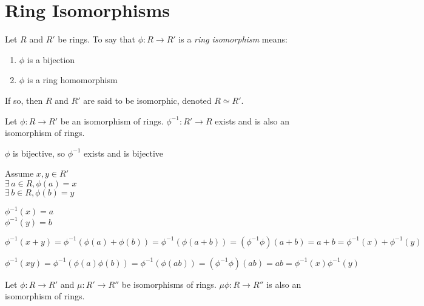 \documentclass[letterpaper,12pt,fleqn]{article}
\begin{document}
\section*{Ring Isomorphisms}

\begin{definition}
  Let $R$ and $R'$ be rings. To say that $\phi:R\to R'$ is a \emph{ring isomorphism}
  means:
  \begin{enumerate}
  \item $\phi$ is a bijection
  \item $\phi$ is a ring homomorphism
  \end{enumerate}
  If so, then $R$ and $R'$ are said to be isomorphic, denoted $R\simeq R'$.
\end{definition}

\begin{lemma}
  Let $\phi:R\to R'$ be an isomorphism of rings. $\phi^{-1}:R'\to R$ exists and is also an
  isomorphism of rings.
\end{lemma}

\begin{theproof}
  $\phi$ is bijective, so $\phi^{-1}$ exists and is bijective

  Assume $x,y\in R'$ \\
  $\exists\,a\in R,\phi(a)=x$ \\
  $\exists\,b\in R,\phi(b)=y$

  $\phi^{-1}(x)=a$ \\
  $\phi^{-1}(y)=b$

  $\phi^{-1}(x+y)=\phi^{-1}(\phi(a)+\phi(b))=\phi^{-1}(\phi(a+b))=(\phi^{-1}\phi)(a+b)=
  a+b=\phi^{-1}(x)+\phi^{-1}(y)$

  $\phi^{-1}(xy)=\phi^{-1}(\phi(a)\phi(b))=\phi^{-1}(\phi(ab))=(\phi^{-1}\phi)(ab)=
  ab=\phi^{-1}(x)\phi^{-1}(y)$
\end{theproof}

\begin{lemma}
  Let $\phi:R\to R'$ and $\mu:R'\to R''$ be isomorphisms of rings.
  $\mu\phi:R\to R''$ is also an isomorphism of rings.
\end{lemma}
\end{document}
